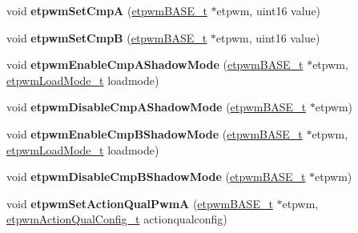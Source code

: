 \begin{DoxyCompactItemize}
\item 
\mbox{\label{group__ePWM_ga0d35a3efab7768166d02a0ffbe854855}} 
void {\bfseries etpwm\+Set\+CmpA} (\mbox{\hyperlink{reg__etpwm_8h_a3030c3a8f18ffd60ee3de5bbd7632891}{etpwm\+B\+A\+S\+E\+\_\+t}} $\ast$etpwm, uint16 value)
\item 
\mbox{\label{group__ePWM_gac6f958daf11a993c82401452c76fca38}} 
void {\bfseries etpwm\+Set\+CmpB} (\mbox{\hyperlink{reg__etpwm_8h_a3030c3a8f18ffd60ee3de5bbd7632891}{etpwm\+B\+A\+S\+E\+\_\+t}} $\ast$etpwm, uint16 value)
\item 
\mbox{\label{group__ePWM_ga8ab67bdbbb5eff712728422c3ce5ce3b}} 
void {\bfseries etpwm\+Enable\+Cmp\+A\+Shadow\+Mode} (\mbox{\hyperlink{reg__etpwm_8h_a3030c3a8f18ffd60ee3de5bbd7632891}{etpwm\+B\+A\+S\+E\+\_\+t}} $\ast$etpwm, \mbox{\hyperlink{etpwm_8h_a3904bcb1c3351b1335302578d951c9b1}{etpwm\+Load\+Mode\+\_\+t}} loadmode)
\item 
\mbox{\label{group__ePWM_ga2a0dc8bb0819f3e4396b32ccaa2cd82f}} 
void {\bfseries etpwm\+Disable\+Cmp\+A\+Shadow\+Mode} (\mbox{\hyperlink{reg__etpwm_8h_a3030c3a8f18ffd60ee3de5bbd7632891}{etpwm\+B\+A\+S\+E\+\_\+t}} $\ast$etpwm)
\item 
\mbox{\label{group__ePWM_ga124ce5d53918b6dc10ab30f25a7730c6}} 
void {\bfseries etpwm\+Enable\+Cmp\+B\+Shadow\+Mode} (\mbox{\hyperlink{reg__etpwm_8h_a3030c3a8f18ffd60ee3de5bbd7632891}{etpwm\+B\+A\+S\+E\+\_\+t}} $\ast$etpwm, \mbox{\hyperlink{etpwm_8h_a3904bcb1c3351b1335302578d951c9b1}{etpwm\+Load\+Mode\+\_\+t}} loadmode)
\item 
\mbox{\label{group__ePWM_gab61f430601d30c74da44d7bd8e60a789}} 
void {\bfseries etpwm\+Disable\+Cmp\+B\+Shadow\+Mode} (\mbox{\hyperlink{reg__etpwm_8h_a3030c3a8f18ffd60ee3de5bbd7632891}{etpwm\+B\+A\+S\+E\+\_\+t}} $\ast$etpwm)
\item 
\mbox{\label{group__ePWM_ga72804f7e95c13557c88b4969202375d3}} 
void {\bfseries etpwm\+Set\+Action\+Qual\+PwmA} (\mbox{\hyperlink{reg__etpwm_8h_a3030c3a8f18ffd60ee3de5bbd7632891}{etpwm\+B\+A\+S\+E\+\_\+t}} $\ast$etpwm, \mbox{\hyperlink{structetpwmActionQualConfig__t}{etpwm\+Action\+Qual\+Config\+\_\+t}} actionqualconfig)
\item 

\end{DoxyCompactItemize}
